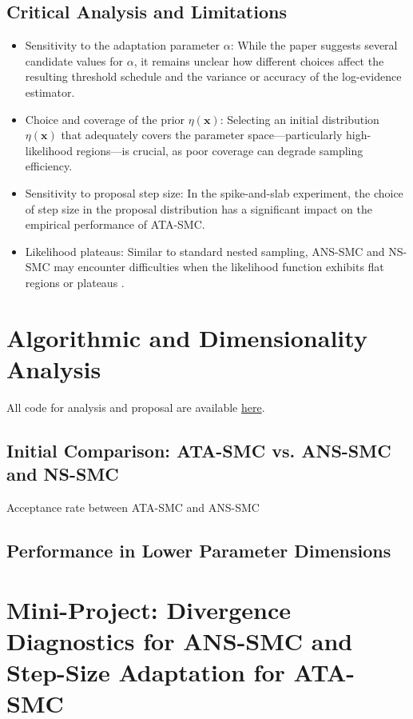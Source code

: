\documentclass[11pt]{article}
\begin{document}
\subsection{Critical Analysis and Limitations}
\begin{itemize}
    \item Sensitivity to the adaptation parameter $\alpha$: While the paper suggests several candidate values for $\alpha$, it remains unclear how different choices affect the resulting threshold schedule and the variance or accuracy of the log-evidence estimator.
    \item Choice and coverage of the prior $\eta(\mathbf{x})$: Selecting an initial distribution $\eta(\mathbf{x})$ that adequately covers the parameter space---particularly high-likelihood regions---is crucial, as poor coverage can degrade sampling efficiency.
    \item Sensitivity to proposal step size: In the spike-and-slab experiment, the choice of step size in the proposal distribution has a significant impact on the empirical performance of ATA-SMC.
    \item Likelihood plateaus: Similar to standard nested sampling, ANS-SMC and NS-SMC may encounter difficulties when the likelihood function exhibits flat regions or plateaus \citep{10.1214/23-SS144}.
\end{itemize}

\section{Algorithmic and Dimensionality Analysis}
All code for analysis and proposal are available \href{https://github.com/thuthiminhnguyen/QP2}{here}.
\subsection{Initial Comparison: ATA-SMC vs. ANS-SMC and NS-SMC}
Acceptance rate between ATA-SMC and ANS-SMC
\subsection{Performance in Lower Parameter Dimensions}
\section{Mini-Project: Divergence Diagnostics for ANS-SMC and Step-Size Adaptation for ATA-SMC}
\end{document}
